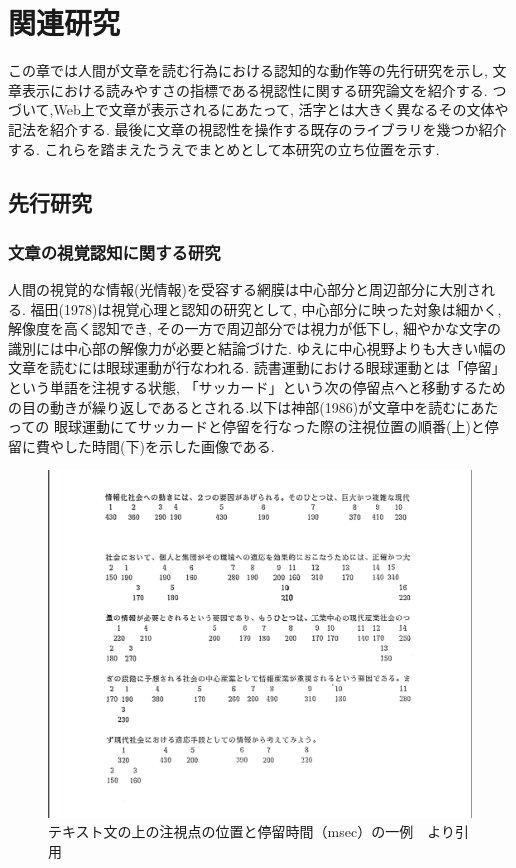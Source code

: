 \chapter{関連研究}
\label{chap:system}

この章では人間が文章を読む行為における認知的な動作等の先行研究を示し,
文章表示における読みやすさの指標である視認性に関する研究論文を紹介する.
つづいて,Web上で文章が表示されるにあたって, 活字とは大きく異なるその文体や記法を紹介する.
最後に文章の視認性を操作する既存のライブラリを幾つか紹介する.
これらを踏まえたうえでまとめとして本研究の立ち位置を示す.

\newpage

\section{先行研究}

\subsection{文章の視覚認知に関する研究}
人間の視覚的な情報(光情報)を受容する網膜は中心部分と周辺部分に大別される.
福田(1978)は視覚心理と認知の研究として, 中心部分に映った対象は細かく, 解像度を高く認知でき, 
その一方で周辺部分では視力が低下し, 細やかな文字の識別には中心部の解像力が必要と結論づけた.\cite{福田78} 
ゆえに中心視野よりも大きい幅の文章を読むには眼球運動が行なわれる.
読書運動における眼球運動とは「停留」という単語を注視する状態, 
「サッカード」という次の停留点へと移動するための目の動きが繰り返しであるとされる.以下は神部(1986)が文章中を読むにあたっての
眼球運動にてサッカードと停留を行なった際の注視位置の順番(上)と停留に費やした時間(下)を示した画像である.\cite{神部86}

\begin{figure}[H]
    \centering
    \label{fig:saccade}
    \includegraphics[width=0.6\columnwidth]{image/02/saccade.png}
    \caption[テキスト文の上の注視点の位置と停留時間（msec）の一例]
     {テキスト文の上の注視点の位置と停留時間（msec）の一例　\protect\cite{神部86}より引用}

\end{figure}

